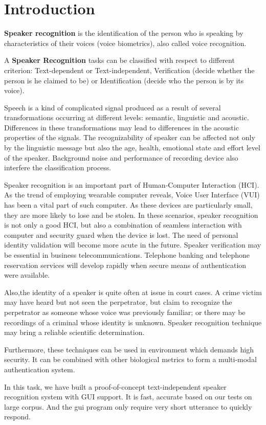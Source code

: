 

\section{Introduction}
\textbf{Speaker recognition} is the identification of the person who is speaking by characteristics
of their voices (voice biometrics), also called voice recognition. \cite{SRwiki}

A \textbf{Speaker Recognition} tasks can be classified with respect to different criterion:
Text-dependent or Text-independent, Verification (decide whether the person is he claimed to be) or
Identification (decide who the person is by its voice).\cite{SRwiki}

Speech is a kind of complicated signal produced as a result of several transformations occurring at
different levels: semantic, linguistic and acoustic.
Differences in these transformations may lead to differences in the acoustic properties of the signals.
The recognizability of speaker can be affected not only by the linguistic message
but also the age, health, emotional state and effort level of the speaker.
Background noise and performance of recording device also interfere
the classification process.

Speaker recognition is an important part of Human-Computer Interaction (HCI).
As the trend of employing wearable computer reveals,
Voice User Interface (VUI) has been a vital part of such computer.
As these devices are particularly small, they are more likely to lose and be stolen.
In these scenarios, speaker recognition is not only a good HCI,
but also a combination of seamless interaction with computer and security guard
when the device is lost.
The need of personal identity validation will become more acute in the future.
Speaker verification may be essential in business telecommunications.
Telephone banking and telephone reservation services will develop rapidly
when secure means of authentication were available.

Also,the identity of a speaker is quite often at issue in court cases.
A crime victim may have heard but not seen the perpetrator,
but claim to recognize the perpetrator as someone whose voice was previously familiar;
or there may be recordings of a criminal whose identity is unknown.
Speaker recognition technique may bring a reliable scientific determination.

Furthermore, these techniques can be used in environment which demands high security.
It can be combined with other biological metrics to form a multi-modal authentication system.

In this task, we have built a proof-of-concept text-independent speaker recognition system with
GUI support. It is fast, accurate based on our tests on large corpus.
And the gui program only require very short utterance to quickly respond.
